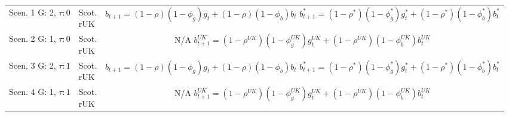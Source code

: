 \renewcommand{\arraystretch}{2}
\begin{table}[H]
    \centering
    \begin{tabular}{l|l|c}
    \makecell{Scen. 1 \\ G: 2, $\tau: 0$} & \makecell{Scot. \\ rUK } & 
        \makecell{
            $b_{t+1} = (1-\rho)(1-\phi_g) g_t + (1-\rho)(1-\phi_b)b_t$\\
            $b^*_{t+1} = (1-\rho^*)(1-\phi^*_g) g^*_t + (1-\rho^*)(1-\phi^*_b)b^*_t$
        }  \\ 
    \makecell{Scen. 2 \\ G: 1, $\tau: 0$} & \makecell{Scot. \\ rUK } & 
        \makecell{
            N/A\\
            $b^{UK}_{t+1} = (1-\rho^{UK})(1-\phi^{UK}_g) g^{UK}_t + (1-\rho^{UK})(1-\phi^{UK}_b)b^{UK}_t$
        }   \\ 
    \makecell{Scen. 3 \\ G: 2, $\tau: 1$} & \makecell{Scot. \\ rUK } & 
    \makecell{
        $b_{t+1} = (1-\rho)(1-\phi_g) g_t + (1-\rho)(1-\phi_b)b_t$\\
        $b^*_{t+1} = (1-\rho^*)(1-\phi^*_g) g^*_t + (1-\rho^*)(1-\phi^*_b)b^*_t$
}  \\
    \makecell{Scen. 4 \\ G: 1, $\tau: 1$} & \makecell{Scot. \\ rUK } & 
    \makecell{
        N/A\\
        $b^{UK}_{t+1} = (1-\rho^{UK})(1-\phi^{UK}_g) g^{UK}_t + (1-\rho^{UK})(1-\phi^{UK}_b)b^{UK}_t$
}  
    \end{tabular}
\end{table}
